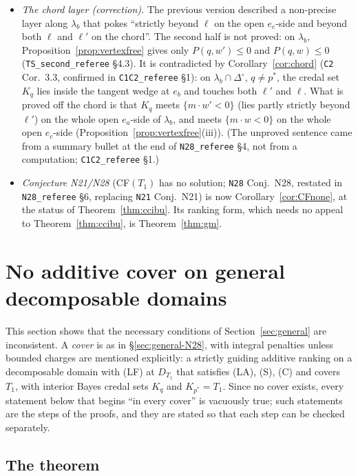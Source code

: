 \documentclass[11pt]{article}
\theoremstyle{definition}
\theoremstyle{remark}
\newcommand{\Di}{\Delta^{\circ}}
\newcommand{\src}[1]{\texttt{#1}}
\begin{document}
\begin{itemize}[leftmargin=*]
\item \emph{The chord layer (correction).} The previous version described a non-precise layer along $\lambda_b$ that pokes ``strictly beyond $\ell$ on the open $e_c$-side and beyond both $\ell$ and $\ell'$ on the chord''. The second half is not proved: on $\lambda_b$, Proposition~\ref{prop:vertexfree} gives only $P(q,w')\le0$ and $P(q,w)\le0$ (\src{TS\_second\_referee} \S4.3). It is contradicted by Corollary~\ref{cor:chord} (\src{C2} Cor.~3.3, confirmed in \src{C1C2\_referee} \S1): on $\lambda_b\cap\Di$, $q\ne p^*$, the credal set $K_q$ lies inside the tangent wedge at $e_b$ and touches both $\ell'$ and $\ell$. What is proved off the chord is that $K_q$ meets $\{m\cdot w'<0\}$ (lies partly strictly beyond $\ell'$) on the whole open $e_a$-side of $\lambda_b$, and meets $\{m\cdot w<0\}$ on the whole open $e_c$-side (Proposition~\ref{prop:vertexfree}(iii)). (The unproved sentence came from a summary bullet at the end of \src{N28\_referee} \S4, not from a computation; \src{C1C2\_referee} \S1.)
\item \emph{Conjecture N21/N28} (CF$(T_1)$ has no solution; \src{N28} Conj.~N28, restated in \src{N28\_referee} \S6, replacing \src{N21} Conj.~N21) is now Corollary~\ref{cor:CFnone}, at the status of Theorem~\ref{thm:ccibu}. Its ranking form, which needs no appeal to Theorem~\ref{thm:ccibu}, is Theorem~\ref{thm:gm}.
\end{itemize}

\section{No additive cover on general decomposable domains}\label{sec:gm}

This section shows that the necessary conditions of Section~\ref{sec:general} are inconsistent. A \emph{cover} is as in \S\ref{sec:general-N28}, with integral penalties unless bounded charges are mentioned explicitly: a strictly guiding additive ranking on a decomposable domain with (LF) at $D_{T_1}$ that satisfies (LA), (S), (C) and covers $T_1$, with interior Bayes credal sets $K_q$ and $K_{p^*}=T_1$. Since no cover exists, every statement below that begins ``in every cover'' is vacuously true; such statements are the steps of the proofs, and they are stated so that each step can be checked separately.

\subsection{The theorem}\label{sec:gm-thm}
\end{document}
